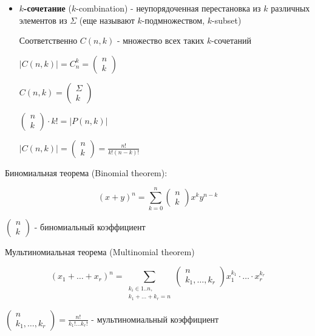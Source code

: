 \documentclass[12pt]{article}
\begin{document}
\begin{itemize}
        \vspace{5mm}

        \item \textbf{$k$-сочетание} ($k$-combination) - неупорядоченная перестановка из $k$ различных элементов из $\Sigma$ (еще называют $k$-подмножеством, $k$-subset)

        Соответственно $C(n, k)$ - множество всех таких $k$-сочетаний

        $|C(n, k)| = C^k_n = \begin{pmatrix}n \\ k\end{pmatrix}$

        $C(n, k) = \begin{pmatrix}\Sigma \\ k\end{pmatrix}$

        $\begin{pmatrix}n \\ k\end{pmatrix} \cdot k! = |P(n, k)|$

        $|C(n, k)| = \begin{pmatrix}n \\ k\end{pmatrix} = \frac{n!}{k!(n - k)!}$

    \end{itemize}

    \Th Биномиальная теорема (Binomial theorem):

    \[(x + y)^n = \sum_{k=0}^n \begin{pmatrix}n \\ k\end{pmatrix} x^k y^{n - k}\]

    $\begin{pmatrix}n \\ k\end{pmatrix}$ - биномиальный коэффициент

    \Th Мультиномиальная теорема (Multinomial theorem)

    \[(x_1 + \dots + x_r)^n = \sum_{\substack{k_i \in 1..n, \\ k_1 + \dots + k_r = n}} \begin{pmatrix}n \\ k_1, \dots, k_r\end{pmatrix} x^{k_1}_1 \cdot \dots \cdot x^{k_r}_r\]

    $\begin{pmatrix}n \\ k_1, \dots, k_r\end{pmatrix} = \frac{n!}{k_1! \dots k_r!}$ - мультиномиальный коэффициент
\end{document}
